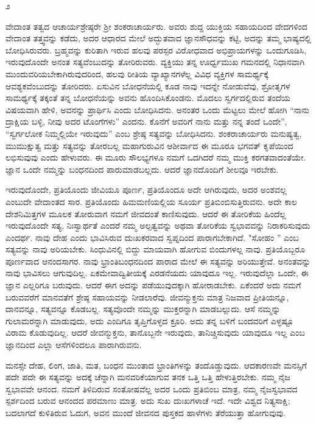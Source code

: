 \begin{center}
೨
\end{center}

ವೇದಾಂತ ತತ್ವದ ಆಚಾರ್ಯಶ್ರೇಷ್ಠರೇ ಶ‍್ರೀ ಶಂಕರಾಚಾರ್ಯರು. ಅವರು ಶುದ್ದ ಯುಕ್ತಿಯ ಸಹಾಯದಿಂದ ವೇದಗಳಿಂದ ವೇದಾಂತ ತತ್ತ್ವವನ್ನು ಕಡೆದು, ಅದರ ಆಧಾರದ ಮೇಲೆ ಅದ್ಭುತವಾದ ಜ್ಞಾನಸೌಧವನ್ನು ಕಟ್ಟಿ, ಅದನ್ನು ತಮ್ಮ ಭಾಷ್ಯದಲ್ಲಿ ಬೋಧಿಸಿರುವರು. ಬ್ರಹ್ಮವನ್ನು ಕುರಿತಾಗಿ ಇರುವ ಹಲವು ಪರಸ್ಪರ ವಿರೋಧವಾದ ಅಭಿಪ್ರಾಯಗಳನ್ನು ಒಂದುಗೂಡಿಸಿ, ಇರುವುದೊಂದೇ ಅನಂತ ಸತ್ಯವೆಂಬುದನ್ನು ತೋರಿರುವರು. ವ್ಯಕ್ತಿಯು ತನ್ನ ಊರ್ಧ್ವಮುಖ ಗಮನದಲ್ಲಿ ನಿಧಾನವಾಗಿ ಮುಂದುವರಿಯಬೇಕಾಗಿರುವುದರಿಂದ, ಹಲವು ರೀತಿಯ ವ್ಯಾಖ್ಯಾನಗಳೆಲ್ಲ ವಿವಿಧ ವ್ಯಕ್ತಿಗಳ ಸಾಮರ್ಥ್ಯಕ್ಕೆ ಆವಶ್ಯಕವೆಂಬುದನ್ನು ತೋರಿದರು. ಏಸುವಿನ ಬೋಧನೆಯಲ್ಲಿ ಕೂಡ ನಾವು ಇದನ್ನೇ ನೋಡುವೆವು, ಶ್ರೋತೃಗಳ ಸಾಮರ್ಥ್ಯಕ್ಕೆ ತಕ್ಕಂತೆ ತನ್ನ ಬೋಧನೆಯನ್ನು ಅವನು ಹೊಂದಿಸಿಕೊಂಡನು. ಮೊದಲು ಸ್ವರ್ಗದಲ್ಲಿರುವ ತಂದೆಯ ವಿಷಯವಾಗಿ ಹೇಳಿ, ಅವನನ್ನು ಪ್ರಾರ್ಥಿಸಿ ಎಂದು ಬೋಧಿಸಿದನು. ಅನಂತರ ಒಂದು ಮೆಟ್ಟಲು ಮೇಲೆ ಹೋಗಿ “ನಾನು ದ್ರಾಕ್ಷಿಯ ಬಳ್ಳಿ, ನೀವು ಅದರ ಟೊಂಗೆಗಳು'' ಎಂದನು. ಕೊನೆಗೆ ಅವರಿಗೆ ನಾನು ಮತ್ತು ನನ್ನ ತಂದೆ ಒಂದೇ”, “ಸ್ವರ್ಗಲೋಕ ನಿಮ್ಮಲ್ಲಿಯೇ ಇರುವುದು'' ಎಂಬ ಶ್ರೇಷ್ಠ ಸತ್ಯವನ್ನು ಬೋಧಿಸಿದನು. ಶಂಕರಾಚಾರ್ಯರು ಮನುಷ್ಯತ್ವ, ಮುಮುಕ್ಷುತ್ವ ಮತ್ತು ಸತ್ಯವನ್ನು ತೋರಬಲ್ಲ ಮಹಾಗುರುವಿನ ಆಶೀರ್ವಾದ ಈ ಮೂರೂ ಭಗವತ್ ಕೃಪೆಯಿಂದ ಲಭಿಸುವುವು ಎಂದು ಹೇಳುವರು. ಈ ಮೂರು ಸೌಲಭ್ಯಗಳೂ ನಮಗೆ ಒದಗಿದರೆ ನಮ್ಮ ಮುಕ್ತಿ ಕರಗತವಾದಂತೆಯೇ. ಜ್ಞಾನ ಒಂದೇ ನಮ್ಮನ್ನು ಬಂಧನದಿಂದ ಪಾರುಮಾಡಬಲ್ಲದು. ಆದರೆ ಜ್ಞಾನದೊಂದಿಗೆ ಶೀಲವೂ ಇರಬೇಕು.

ಇರುವುದೊಂದೇ, ಪ್ರತಿಯೊಂದು ಜೀವಿಯೂ ಪೂರ್ಣ, ಪ್ರತಿಯೊಂದೂ ಅದೇ ಆಗಿರುವುದು, ಅದರ ಅಂಶವಲ್ಲ ಎಂಬುದೇ ವೇದಾಂತದ ಸಾರ. ಪ್ರತಿಯೊಂದು ಹಿಮಮಣಿಯಲ್ಲಿಯ ಸೂರ್ಯ ಪ್ರತಿಬಿಂಬಿಸುತ್ತಿರುವನು. ಅದೇ ಕಾಲ ದೇಶನಿಮಿತ್ತಗಳ ಮೂಲಕ ತೋರುವಾಗ ನಮಗೆ ಜೀವದಂತೆ ಕಾಣಿಸುವುದು. ಆದರೆ ಈ ತೋರಿಕೆಯ ಹಿಂದೆಲ್ಲ ಇರುವುದೊಂದೇ ಸತ್ಯ, ನಿಃಸ್ವಾರ್ಥತೆ ಎಂದರೆ ನಮ್ಮ ಅಲ್ಪತ್ವವನ್ನು ಅಥವಾ ತೋರಿಕೆಯ ಸ್ವಭಾವವನ್ನು ನಿರಾಕರಿಸುವುದು ಎಂದರ್ಥ. ನಾವು ದೇಹ ಎಂದು ಭಾವಿಸಿರುವ ದುಃಖಕರವಾದ ಸ್ವಪ್ನದಿಂದ ಪಾರಾಗಬೇಕಾಗಿದೆ. "ಸೋಹಂ '' ಎಂಬ ಸತ್ಯವನ್ನು ನಾವು ಅರಿಯಬೇಕು. ಸಿಂಧುವಿನಲ್ಲಿ ಬಿದ್ದು ಮಾಯವಾಗಿ ಹೋಗುವ ಬಿಂದುಗಳಲ್ಲ ನಾವು. ಪ್ರತಿಯೊಬ್ಬರೂ ಪೂರ್ಣವಾದ ಆನಂದಸಾಗರ. ನಾವು ಭ್ರಾಂತಿಬಂಧನದಿಂದ ಪಾರಾದ ಮೇಲೆ ಈ ಸತ್ಯವನ್ನು ಅರಿಯುತ್ತೇವೆ. ಅನಂತವನ್ನು ನಾವು ಭಾವಿಸಲು ಆಗುವುದಿಲ್ಲ. ಏಕಮೇವಾದ್ವಿತೀಯಕ್ಕೆ ಎರಡನೆಯದು ಯಾವುದೂ ಇಲ್ಲ. ಇರುವುದೆಲ್ಲಾ ಒಂದೇ, ಈ ಜ್ಞಾನ ಎಲ್ಲರಿಗೂ ಬರುವುದು. ಆದರೆ ಈಗ ಅದನ್ನು ಪಡೆಯುವುದಕ್ಕಾಗಿ ಹೋರಾಡಬೇಕು. ಏಕೆಂದರೆ ಅದು ನಮಗೆ ಬರುವವರೆಗೆ ಮಾನವತೆಗೆ ಶ್ರೇಷ್ಠ ಸಹಾಯವನ್ನು ನೀಡಲಾರೆವು. ಜೀವನ್ಮುಕ್ತನು ಮಾತ್ರ ನಿಜವಾದ ಪ್ರೀತಿಯನ್ನೂ, ದಾನವನ್ನೂ, ಸತ್ಯವನ್ನೂ ಕೊಡಬಲ್ಲ. ಸತ್ಯವೊಂದೇ ನಮ್ಮನ್ನು ಮುಕ್ತರನ್ನಾಗಿ ಮಾಡಬಲ್ಲುದು. ಆಸೆ ನಮ್ಮನ್ನು ಗುಲಾಮರನ್ನಾಗಿ ಮಾಡುವುದು, ಅದು ಎಂದಿಗೂ ತೃಪ್ತಿಗೊಳ್ಳದ ಕ್ರೂರಿ. ಅದು ತನ್ನ ಬಳಿಗೆ ಬಂದವರಿಗೆ ಎಳ್ಳಷ್ಟೂ ವಿರಾಮ ಕೊಡುವುದಿಲ್ಲ. ಆದರೆ ಜೀವನ್ಮುಕ್ತನು, ತಾನೊಬ್ಬನೇ ಇರುವುದು, ತಾನಿಚ್ಚಿಸುವುದು ಯಾವುದೂ ಇಲ್ಲ ಎಂಬ ಜ್ಞಾನದಿಂದ ಎಲ್ಲಾ ಆಸೆಗಳಿಂದಲೂ ಪಾರಾಗಿರುವನು.

\newpage

ಮನಸ್ಸೇ ದೇಹ, ಲಿಂಗ, ಜಾತಿ, ಮತ, ಬಂಧನ ಮುಂತಾದ ಭ್ರಾಂತಿಗಳನ್ನು ತಂದೊಡ್ಡುವುದು. ಆದಕಾರಣವೇ ಮನಸ್ಸಿಗೆ ಪದೇ ಪದೇ ಈ ಸತ್ಯವನ್ನು ಅದಕ್ಕೆ ಚೆನ್ನಾಗಿ ಮನವರಿಕೆಯಾಗುವ ತನಕ ಒತ್ತಿ ಒತ್ತಿ ಹೇಳುತ್ತಿರಬೇಕು. ನಮ್ಮ ನೈಜ ಸ್ವಭಾವವೇ ಆನಂದ. ನಮಗೆ ತಿಳಿದಿರುವ ಸಂತೋಷವೆಲ್ಲ ಅದರ ಒಂದು ಪ್ರತಿಬಿಂಬ ಮಾತ್ರ, ನಮ್ಮ ನೈಜಸ್ವಭಾವದ ಸ್ಪರ್ಶದಿಂದ ಬರುವ ಆನಂದದ ಪರಮಾಣು ಮಾತ್ರ. ಅದು ಸುಖ ದುಃಖಗಳಾಚೆ ಇದೆ. ಇದೇ ವಿಶ್ವದ ನಿತ್ಯಸಾಕ್ಷಿ; ಬದಲಾಗದೆ ಕುಳಿತಿರುವ ಓದುಗ, ಅವನ ಮುಂದೆ ಜೀವನದ ಪುಸ್ತಕದ ಹಾಳೆಗಳು ತೆರೆಯುತ್ತಾ ಹೋಗುವುವು.

